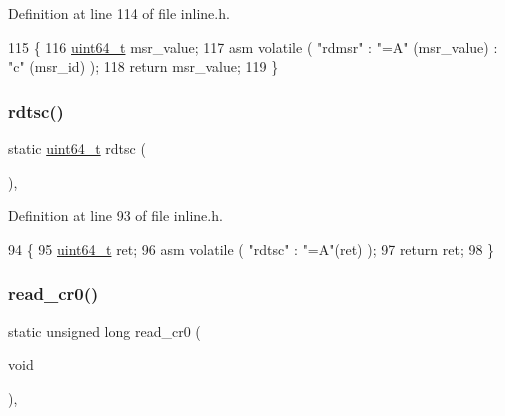 Definition at line 114 of file inline.\+h.


\begin{DoxyCode}
115 \{
116     \hyperlink{a00095_aa232ecf786a74ce5363c36c10798d2b1_aa232ecf786a74ce5363c36c10798d2b1}{uint64\_t} msr\_value;
117     \textcolor{keyword}{asm} \textcolor{keyword}{volatile} ( \textcolor{stringliteral}{"rdmsr"} : \textcolor{stringliteral}{"=A"} (msr\_value) : \textcolor{stringliteral}{"c"} (msr\_id) );
118     \textcolor{keywordflow}{return} msr\_value;
119 \}
\end{DoxyCode}
\mbox{\label{a00104_a47b9d70be3022fd0b5687d9794ca47bc_a47b9d70be3022fd0b5687d9794ca47bc}} 
\subsubsection{\texorpdfstring{rdtsc()}{rdtsc()}}
{\footnotesize\ttfamily static \hyperlink{a00095_aa232ecf786a74ce5363c36c10798d2b1_aa232ecf786a74ce5363c36c10798d2b1}{uint64\+\_\+t} rdtsc (\begin{DoxyParamCaption}{ }\end{DoxyParamCaption})\hspace{0.3cm}{\ttfamily [inline]}, {\ttfamily [static]}}



Definition at line 93 of file inline.\+h.


\begin{DoxyCode}
94 \{
95     \hyperlink{a00095_aa232ecf786a74ce5363c36c10798d2b1_aa232ecf786a74ce5363c36c10798d2b1}{uint64\_t} ret;
96     \textcolor{keyword}{asm} \textcolor{keyword}{volatile} ( \textcolor{stringliteral}{"rdtsc"} : \textcolor{stringliteral}{"=A"}(ret) );
97     \textcolor{keywordflow}{return} ret;
98 \}
\end{DoxyCode}
\mbox{\label{a00104_ac85e095222f364961e091702bb6bc2ff_ac85e095222f364961e091702bb6bc2ff}} 
\subsubsection{\texorpdfstring{read\+\_\+cr0()}{read\_cr0()}}
{\footnotesize\ttfamily static unsigned long read\+\_\+cr0 (\begin{DoxyParamCaption}\item[{void}]{ }\end{DoxyParamCaption})\hspace{0.3cm}{\ttfamily [inline]}, {\ttfamily [static]}}



